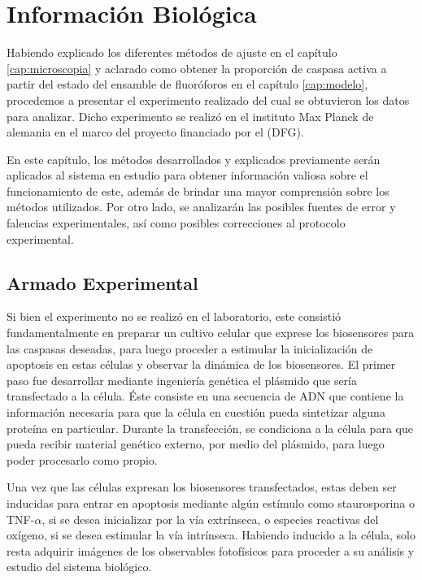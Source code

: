 \chapter{Información Biológica}
\label{cap:informacion}

Habiendo explicado los diferentes métodos de ajuste en el capítulo \ref{cap:microscopia} y aclarado como obtener la proporción de caspasa activa a partir del estado del ensamble de fluoróforos en el capítulo \ref{cap:modelo}, procedemos a presentar el experimento realizado del cual se obtuvieron los datos para analizar. Dicho experimento se realizó en el instituto Max Planck de alemania en el marco del proyecto  financiado por el  (DFG).

En este capítulo, los métodos desarrollados y explicados previamente serán aplicados al sistema en estudio para obtener información valiosa sobre el funcionamiento de este, además de brindar una mayor comprensión sobre los métodos utilizados. Por otro lado, se analizarán las posibles fuentes de error y falencias experimentales, así como posibles correcciones al protocolo experimental.


\section{Armado Experimental}

Si bien el experimento no se realizó en el laboratorio, este consistió fundamentalmente en preparar un cultivo celular que exprese los biosensores para las caspasas deseadas, para luego proceder a estimular la inicialización de apoptosis en estas células y observar la dinámica de los biosensores. El primer paso fue desarrollar mediante ingeniería genética el plásmido que sería transfectado a la célula. Éste consiste en una secuencia de ADN que contiene la información necesaria para que la célula en cuestión pueda sintetizar alguna proteína en particular. Durante la transfección, se condiciona a la célula para que pueda recibir material genético externo, por medio del plásmido, para luego poder procesarlo como propio.

Una vez que las células expresan los biosensores transfectados, estas deben ser inducidas para entrar en apoptosis mediante algún estímulo como staurosporina o TNF-$\alpha$, si se desea inicializar por la vía extrínseca, o especies reactivas del oxígeno, si se desea estimular la vía intrínseca. Habiendo inducido a la célula, solo resta adquirir imágenes de los observables fotofísicos para proceder a su análisis y estudio del sistema biológico.

